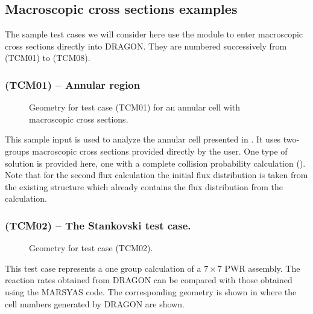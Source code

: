 \subsection{Macroscopic cross sections examples}\label{sect:ExMACROLIB}

The sample test cases we will consider here use the  module to enter
macroscopic cross sections directly into DRAGON. They are numbered successively
from \tst(TCM01) to \tst(TCM08).

\subsubsection{\tst(TCM01) -- Annular region}

\begin{figure}[h!]  
\begin{center} 
\epsfxsize=6cm \centerline{ }
\parbox{16cm}{\caption{Geometry for test case \tst(TCM01) for an annular cell with
macroscopic cross sections.}\label{fig:TCM01}}    
\end{center}  
\end{figure}

This sample input is used to analyze the annular cell presented in .
It uses two-groups macroscopic cross sections provided directly by the user. One
type of solution is provided here, one with a complete collision probability
calculation (). Note that for the second flux calculation the
initial flux distribution is taken from the existing  structure
which already contains the flux distribution from the
 calculation. 


\subsubsection{\tst(TCM02) -- The Stankovski test case.}

\begin{figure}[h!]  
\begin{center} 
\epsfxsize=10cm \centerline{ }
\parbox{14cm}{\caption{Geometry for test case \tst(TCM02).}\label{fig:TCM02}}    
\end{center}    \end{figure}

This test case represents a one group calculation of a $7\times 7$ PWR assembly.
The reaction rates obtained from DRAGON can be compared with those obtained
using the MARSYAS code.\cite{DragonPIJS2,DragonPIJS3,Stankovski} The
corresponding geometry is shown in  where the cell numbers generated
by DRAGON are shown.

